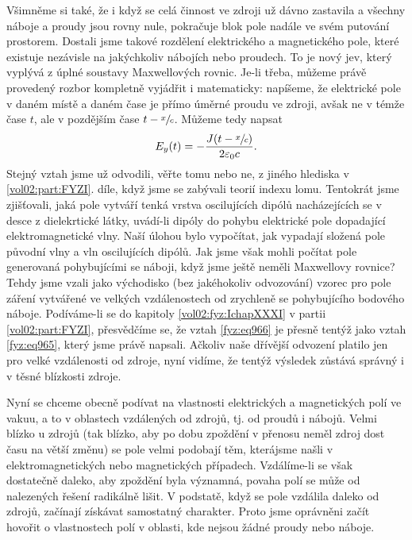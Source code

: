     Všimněme si také, že i když se celá činnost ve zdroji už dávno zastavila a všechny náboje a
    proudy jsou rovny nule, pokračuje blok pole nadále ve svém putování prostorem. Dostali jsme
    takové rozdělení elektrického a magnetického pole, které existuje nezávisle na jakýchkoliv
    nábojích nebo proudech. To je nový jev, který vyplývá z úplné soustavy Maxwellových rovnic.
    Je-li třeba, můžeme právě provedený rozbor kompletně vyjádřit i matematicky: napíšeme, že
    elektrické pole v daném místě a daném čase je přímo úměrné proudu ve zdroji, avšak ne v témže
    čase \(t\), ale v pozdějším čase \(t-\sfrac{x}{c}\). Můžeme tedy napsat
    \begin{equation}\label{fyz:eq965}
      E_y(t)=-\dfrac{J(t-\sfrac{x}{c})}{2\varepsilon_0 c}.
    \end{equation}
    Stejný vztah jsme už odvodili, věřte tomu nebo ne, z jiného hlediska v \ref{vol02:part:FYZI}. díle,
    když jsme se zabývali teorií indexu lomu. Tentokrát jsme zjišťovali, jaká pole vytváří tenká
    vrstva oscilujících dipólů nacházejících se v desce z dielekrtické látky, uvádí-li dipóly do
    pohybu elektrické pole dopadající elektromagnetické vlny. Naší úlohou bylo vypočítat, jak
    vypadají složená pole původní vlny a vln oscilujících dipólů. Jak jsme však mohli počítat pole
    generovaná pohybujícími se náboji, když jsme ještě neměli Maxwellovy rovnice? Tehdy jsme vzali
    jako východisko (bez jakéhokoliv odvozování) vzorec pro pole záření vytvářené ve velkých
    vzdálenostech od zrychleně se pohybujícího bodového náboje. Podíváme-li se do kapitoly
    \ref{vol02:fyz:IchapXXXI} v partii \ref{vol02:part:FYZI}, přesvědčíme se, že vztah \eqref{fyz:eq966} je
    přesně tentýž jako vztah \eqref{fyz:eq965}, který jsme právě napsali. Ačkoliv naše dřívější
    odvození platilo jen pro velké vzdálenosti od zdroje, nyní vidíme, že tentýž výsledek zůstává
    správný i v těsné blízkosti zdroje.

    Nyní se chceme obecně podívat na vlastnosti elektrických a magnetických polí ve vakuu, a to v
    oblastech vzdálených od zdrojů, tj. od proudů i nábojů. Velmi blízko u zdrojů (tak blízko, aby
    po dobu zpoždění v přenosu neměl zdroj dost času na větší změnu) se pole velmi podobají těm,
    kterájsme našli v elektromagnetických nebo magnetických případech. Vzdálíme-li se však
    dostatečně daleko, aby zpoždění byla významná, povaha polí se může od nalezených řešení
    radikálně lišit. V podstatě, když se pole vzdálila daleko od zdrojů, začínají získávat
    samostatný charakter. Proto jsme oprávněni začít hovořit o vlastnostech polí v oblasti, kde
    nejsou žádné proudy nebo náboje.
    
